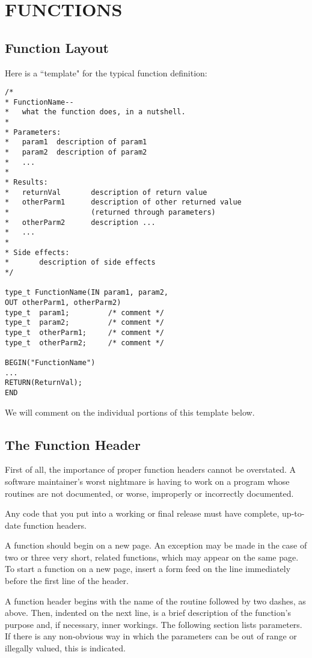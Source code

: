 \section{\bf FUNCTIONS}

\subsection{Function Layout}

Here is a ``template" for the typical function
definition:

\begin{verbatim}
/*
* FunctionName--
*   what the function does, in a nutshell.
*
* Parameters:
*   param1  description of param1
*   param2  description of param2
*   ...
*
* Results:
*   returnVal       description of return value
*   otherParm1      description of other returned value
*                   (returned through parameters)
*   otherParm2      description ...
*   ...
*
* Side effects:
*       description of side effects
*/

type_t FunctionName(IN param1, param2,
OUT otherParm1, otherParm2)
type_t  param1;         /* comment */
type_t  param2;         /* comment */
type_t  otherParm1;     /* comment */
type_t  otherParm2;     /* comment */

BEGIN("FunctionName")
...
RETURN(ReturnVal);
END
\end{verbatim}

We will comment on the individual portions of this template below.

\subsection{The Function Header}

First of all, the importance of proper function headers cannot be
overstated.  A software maintainer's worst nightmare is having to work
on a program whose routines are not documented, or worse, improperly
or incorrectly documented.


Any code that you put into a working or final release must have
complete, up-to- date function headers.

A function should begin on a new page.  An exception may be made in
the case of two or three very short, related functions, which may
appear on the same page.  To start a function on a new page, insert a
form feed on the line immediately before the first line of the header.

A function header begins with the name of the routine followed by two
dashes, as above.  Then, indented on the next line, is a brief
description of the function's purpose and, if necessary, inner
workings.  The following section lists parameters.  If there is any
non-obvious way in which the parameters can be out of range or
illegally valued, this is indicated.

